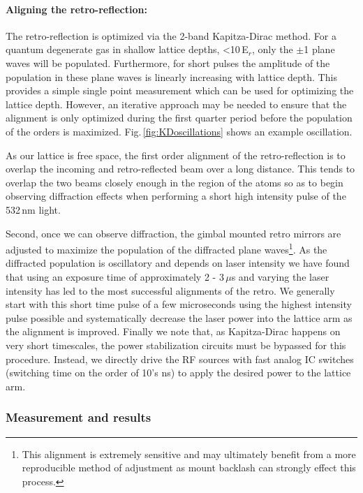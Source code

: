 \paragraph{Aligning the retro-reflection:}
The retro-reflection is optimized via the 2-band Kapitza-Dirac method.
For a quantum degenerate gas in shallow lattice depths, <10\,E$_r$, only the $\pm$1 plane waves will be populated.
Furthermore, for short pulses the amplitude of the population in these plane waves is linearly increasing with lattice depth.
This provides a simple single point measurement which can be used for optimizing the lattice depth.
However, an iterative approach may be needed to ensure that the alignment is only optimized during the first quarter period before the population of the orders is maximized.
Fig.\,\ref{fig:KDoscillations} shows an example oscillation.

As our lattice is free space, the first order alignment of the retro-reflection is to overlap the incoming and retro-reflected beam over a long distance.
This tends to overlap the two beams closely enough in the region of the atoms so as to begin observing diffraction effects when performing a short high intensity pulse of the 532\,nm light.

Second, once we can observe diffraction, the gimbal mounted retro mirrors are adjusted to maximize the population of the diffracted plane waves\footnote{This alignment is extremely sensitive and may ultimately benefit from a more reproducible method of adjustment as mount backlash can strongly effect this process.}.
As the diffracted population is oscillatory and depends on laser intensity we have found that using an exposure time of approximately 2 - 3\,$\mu$s and varying the laser intensity has led to the most successful alignments of the retro.
We generally start with this short time pulse of a few microseconds using the highest intensity pulse possible and systematically decrease the laser power into the lattice arm as the alignment is improved.
Finally we note that, as Kapitza-Dirac happens on very short timescales, the power stabilization circuits must be bypassed for this procedure.
Instead, we directly drive the RF sources with fast analog IC switches (switching time on the order of 10's ns) to apply the desired power to the lattice arm.

\subsubsection{Measurement and results}
